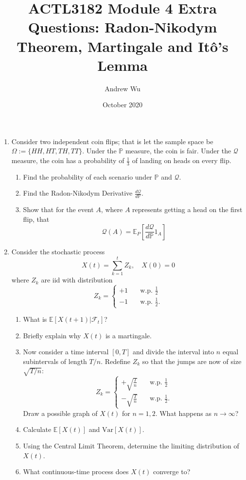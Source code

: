 \documentclass[11pt]{article}
\title{\textbf{ACTL3182 Module 4 Extra Questions: Radon-Nikodym Theorem, Martingale and It\^o's Lemma}}
\author{Andrew Wu}
\date{October 2020}
\newcommand{\E}{\mathbb{E}}
\newcommand{\PR}{\mathbb{P}}
\newcommand{\Q}{\mathcal{Q}}
\begin{document}
	\maketitle
	\begin{enumerate}
		\item Consider two independent coin flips; that is let the sample space be $\Omega:=\{HH, HT, TH, TT\}$. Under the $\PR$ measure, the coin is fair. Under the $\Q$ measure, the coin has a probability of $\frac{1}{3}$ of landing on heads on every flip. 
		\begin{enumerate}
			\item Find the probability of each scenario under $\PR$ and $\Q$.
			\item Find the Radon-Nikodym Derivative $\frac{d\Q}{d\PR}$.
			\item Show that for the event $A$, where $A$ represents getting a head on the first flip, that
			\[	\Q(A) = \E_{P}\left[\frac{d\Q}{d\PR}1_{A}\right]
					\]
 		\end{enumerate}
		\item Consider the stochastic process 
		\[	X(t) = \sum_{k=1}^{t}Z_{k},\quad X(0) = 0
			\]
		where $Z_{k}$ are iid with distribution 
		\[	Z_{k} = \begin{cases}
						+1 &  \quad \text{w.p. } \frac{1}{2} \\
						-1 & \quad \text{w.p. } \frac{1}{2}.
						\end{cases}
			\]
			\begin{enumerate}
				\item What is $\E[X(t+1)|\mathcal{F}_{t}]$?
				\item Briefly explain why $X(t)$ is a martingale.
				\item Now consider a time interval $[0, T]$ and divide the interval into $n$ equal subintervals of length $T/n$. Redefine $Z_{k}$ so that the jumps are now of size $\sqrt{T/n}$:
				\[	Z_{k} = \begin{cases}
				+\sqrt{\frac{T}{n}} &  \quad \text{w.p. } \frac{1}{2} \\[5pt]
				-\sqrt{\frac{T}{n}} & \quad \text{w.p. } \frac{1}{2}.
				\end{cases}
				\]
				Draw a possible graph of $X(t)$ for $n=1,2$. What happens as $n\to\infty$?
				\item Calculate $\E[X(t)]$ and $\text{Var}[X(t)]$.
				\item Using the Central Limit Theorem, determine the limiting distribution of $X(t)$.
				\item What continuous-time process does $X(t)$ converge to?

\end{enumerate}
\end{enumerate}
\end{document}

